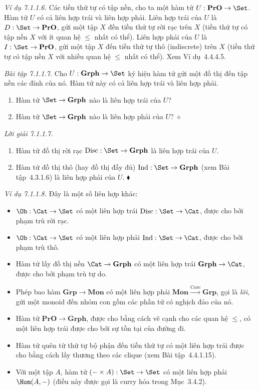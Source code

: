\noindent\textit{Ví dụ 7.1.1.6.}\keepwithnext
Các tiền thứ tự có tập nền, cho ta một hàm tử $U:\mathbf{PrO}\to\Set$. Hàm tử $U$ có cả liên hợp trái và liên hợp phải. Liên hợp trái của $U$ là $D:\Set\to\mathbf{PrO}$, gửi một tập $X$ đến tiền thứ tự rời rạc trên $X$ (tiền thứ tự có tập nền $X$ với ít quan hệ $\le$ nhất có thể). Liên hợp phải của $U$ là $I:\Set\to\mathbf{PrO}$, gửi một tập $X$ đến tiền thứ tự thô (indiscrete) trên $X$ (tiền thứ tự có tập nền $X$ với nhiều quan hệ $\le$ nhất có thể). Xem Ví dụ~4.4.4.5.

\noindent\textit{Bài tập 7.1.1.7.}\keepwithnext
Cho $U:\mathbf{Grph}\to\Set$ ký hiệu hàm tử gửi một đồ thị đến tập nền các đỉnh của nó. Hàm tử này có cả liên hợp trái và liên hợp phải.
\begin{enumerate}[label=\alph*.]
\item Hàm tử $\Set\to\mathbf{Grph}$ nào là liên hợp trái của $U$?
\item Hàm tử $\Set\to\mathbf{Grph}$ nào là liên hợp phải của $U$?
\nobreak\hfill$\diamond$
\end{enumerate}

\noindent\textit{Lời giải 7.1.1.7.}\keepwithnext
\begin{enumerate}[label=\alph*.]
\item Hàm tử đồ thị rời rạc $\operatorname{Disc}:\Set\to\mathbf{Grph}$ là liên hợp trái của $U$.
\item Hàm tử đồ thị thô (hay đồ thị đầy đủ) $\operatorname{Ind}:\Set\to\mathbf{Grph}$ (xem Bài tập~4.3.1.6) là liên hợp phải của $U$.
\nobreak\hfill$\blacklozenge$
\end{enumerate}

\noindent\textit{Ví dụ 7.1.1.8.}\keepwithnext
Đây là một số liên hợp khác:
\begin{itemize}
\item $\Ob:\Cat\to\Set$ có một liên hợp trái $\operatorname{Disc}:\Set\to\Cat$, được cho bởi phạm trù rời rạc.
\item $\Ob:\Cat\to\Set$ có một liên hợp phải $\operatorname{Ind}:\Set\to\Cat$, được cho bởi phạm trù thô.
\item Hàm tử lấy đồ thị nền $\Cat\to\mathbf{Grph}$ có một liên hợp trái $\mathbf{Grph}\to\Cat$, được cho bởi phạm trù tự do.
\item Phép bao hàm $\mathbf{Grp}\to\mathbf{Mon}$ có một liên hợp phải $\mathbf{Mon}\xrightarrow{\operatorname{Core}}\mathbf{Grp}$, gọi là \emph{lõi}, gửi một monoid đến nhóm con gồm các phần tử có nghịch đảo của nó.
\item Hàm tử $\mathbf{PrO}\to\mathbf{Grph}$, được cho bằng cách vẽ cạnh cho các quan hệ $\le$, có một liên hợp trái được cho bởi sự tồn tại của đường đi.
\item Hàm tử quên từ thứ tự bộ phận đến tiền thứ tự có một liên hợp trái được cho bằng cách lấy thương theo các clique (xem Bài tập~4.4.1.15).
\item Với một tập $A$, hàm tử $(-\times A):\Set\to\Set$ có một liên hợp phải $\Hom(A,-)$ (điều này được gọi là curry hóa trong Mục~3.4.2).
\end{itemize}

